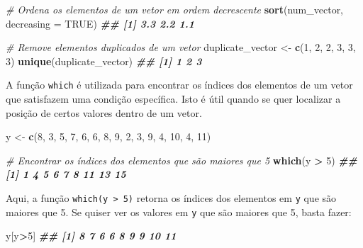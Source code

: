 \documentclass[
]{book}
\newenvironment{Shaded}{\begin{snugshade}}{\end{snugshade}}
\newcommand{\AttributeTok}[1]{\textcolor[rgb]{0.13,0.29,0.53}{#1}}
\newcommand{\CommentTok}[1]{\textcolor[rgb]{0.56,0.35,0.01}{\textit{#1}}}
\newcommand{\ConstantTok}[1]{\textcolor[rgb]{0.56,0.35,0.01}{#1}}
\newcommand{\DecValTok}[1]{\textcolor[rgb]{0.00,0.00,0.81}{#1}}
\newcommand{\DocumentationTok}[1]{\textcolor[rgb]{0.56,0.35,0.01}{\textbf{\textit{#1}}}}
\newcommand{\FunctionTok}[1]{\textcolor[rgb]{0.13,0.29,0.53}{\textbf{#1}}}
\newcommand{\NormalTok}[1]{#1}
\newcommand{\OtherTok}[1]{\textcolor[rgb]{0.56,0.35,0.01}{#1}}
\newcommand{\SpecialCharTok}[1]{\textcolor[rgb]{0.81,0.36,0.00}{\textbf{#1}}}
\begin{document}
\begin{Shaded}
\begin{Highlighting}[]
\CommentTok{\# Ordena os elementos de um vetor em ordem decrescente}
\FunctionTok{sort}\NormalTok{(num\_vector, }\AttributeTok{decreasing =} \ConstantTok{TRUE}\NormalTok{)}
\DocumentationTok{\#\# [1] 3.3 2.2 1.1}

\CommentTok{\# Remove elementos duplicados de um vetor}
\NormalTok{duplicate\_vector }\OtherTok{\textless{}{-}} \FunctionTok{c}\NormalTok{(}\DecValTok{1}\NormalTok{, }\DecValTok{2}\NormalTok{, }\DecValTok{2}\NormalTok{, }\DecValTok{3}\NormalTok{, }\DecValTok{3}\NormalTok{, }\DecValTok{3}\NormalTok{)}
\FunctionTok{unique}\NormalTok{(duplicate\_vector)}
\DocumentationTok{\#\# [1] 1 2 3}
\end{Highlighting}
\end{Shaded}

A função \texttt{which} é utilizada para encontrar os índices dos elementos de
um vetor que satisfazem uma condição específica. Isto é útil quando se
quer localizar a posição de certos valores dentro de um vetor.

\begin{Shaded}
\begin{Highlighting}[]
\NormalTok{y }\OtherTok{\textless{}{-}} \FunctionTok{c}\NormalTok{(}\DecValTok{8}\NormalTok{, }\DecValTok{3}\NormalTok{, }\DecValTok{5}\NormalTok{, }\DecValTok{7}\NormalTok{, }\DecValTok{6}\NormalTok{, }\DecValTok{6}\NormalTok{, }\DecValTok{8}\NormalTok{, }\DecValTok{9}\NormalTok{, }\DecValTok{2}\NormalTok{, }\DecValTok{3}\NormalTok{, }\DecValTok{9}\NormalTok{, }\DecValTok{4}\NormalTok{, }\DecValTok{10}\NormalTok{, }\DecValTok{4}\NormalTok{, }\DecValTok{11}\NormalTok{)}

\CommentTok{\# Encontrar os índices dos elementos que são maiores que 5}
\FunctionTok{which}\NormalTok{(y }\SpecialCharTok{\textgreater{}} \DecValTok{5}\NormalTok{)}
\DocumentationTok{\#\# [1]  1  4  5  6  7  8 11 13 15}
\end{Highlighting}
\end{Shaded}

Aqui, a função \texttt{which(y\ \textgreater{}\ 5)} retorna os índices dos elementos em \texttt{y}
que são maiores que 5. Se quiser ver os valores em \texttt{y} que são maiores
que 5, basta fazer:

\begin{Shaded}
\begin{Highlighting}[]
\NormalTok{y[y}\SpecialCharTok{\textgreater{}}\DecValTok{5}\NormalTok{]}
\DocumentationTok{\#\# [1]  8  7  6  6  8  9  9 10 11}
\end{Highlighting}
\end{Shaded}
\end{document}
